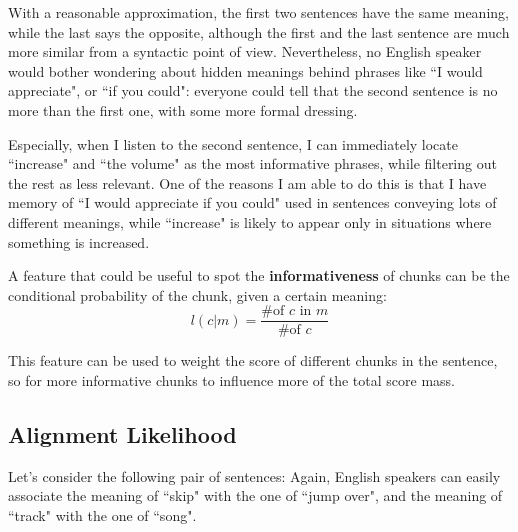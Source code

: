 With a reasonable approximation, the first two sentences have the same meaning, while the last says the opposite, although the first and the last sentence are much more similar from a syntactic point of view. Nevertheless, no English speaker would bother wondering about hidden meanings behind phrases like ``I would appreciate", or ``if you could": everyone could tell that the second sentence is no more than the first one, with some more formal dressing.

Especially, when I listen to the second sentence, I can immediately locate ``increase" and ``the volume" as the most informative phrases, while filtering out the rest as less relevant. One of the reasons I am able to do this is that I have memory of ``I would appreciate if you could" used in sentences conveying lots of different meanings, while ``increase" is likely to appear only in situations where something is increased.

A feature that could be useful to spot the \textbf{informativeness} of chunks can be the conditional probability of the chunk, given a certain meaning:
$$
l(c|m)=\frac{\text{\# of }c\text{ in }m}{\text{\# of }c}
$$

This feature can be used to weight the score of different chunks in the sentence, so for more informative chunks to influence more of the total score mass.
\subsection{Alignment Likelihood}\label{ch3:ml:al}
Let's consider the following pair of sentences:
Again, English speakers can easily associate the meaning of ``skip" with the one of ``jump over", and the meaning of ``track" with the one of ``song".

